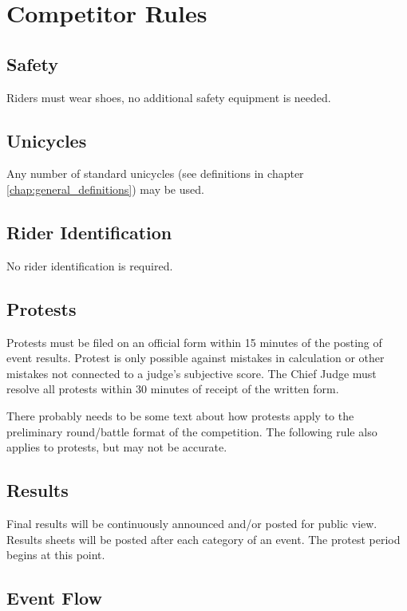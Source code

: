 \chapter{Competitor Rules}

\section{Safety}

Riders must wear shoes, no additional safety equipment is needed.

\section{Unicycles}

Any number of standard unicycles (see definitions in chapter \ref{chap:general_definitions}) may be used.

\section{Rider Identification}

No rider identification is required.

\section{Protests}

Protests must be filed on an official form within 15 minutes of the posting of event results.
Protest is only possible against mistakes in calculation or other mistakes not connected to a judge's subjective score.
The Chief Judge must resolve all protests within 30 minutes of receipt of the written form.

\begin{comment2016}
There probably needs to be some text about how protests apply to the preliminary round/battle format of the competition.  The following rule also applies to protests, but may not be accurate.
\end{comment2016}

\section{Results}
Final results will be continuously announced and/or posted for public view.
Results sheets will be posted after each category of an event.
The protest period begins at this point.

\section{Event Flow}

